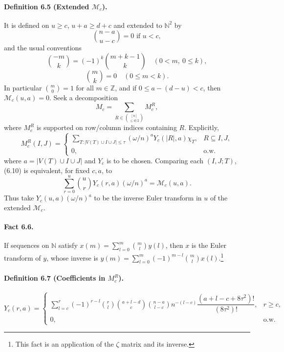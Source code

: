 \documentclass[10pt,a4paper]{article}
\begin{document}
\paragraph{Definition 6.5 (Extended $\mathcal M_c$).} It is defined on $u\ge c$, $u+a\ge d+c$ and extended to $\mathbb N^2$ by
\[\binom{n-a}{u-c}=0\text{ if }u<c,\tag{6.7}\]
and the usual conventions
\[\binom{-m}k=(-1)^k\binom{m+k-1}k\quad(0<m,\ 0\le k),\tag{6.8}\]
\[\binom mk=0\quad(0\le m<k).\tag{6.9}\]
In particular $\binom m0=1$ for all $m\in\mathbb Z$, and if $0\le a-(d-u)<c$, then $\mathcal M_c(u,a)=0$.
Seek a decomposition
\[M_c=\sum_{R\in\binom{[n]}{\le d/2}}M_c^R,\tag{6.10}\]
where $M_c^R$ is supported on row/column indices containing $R$. Explicitly,
\[M_c^R(I,J)=\begin{cases}\sum_{T:|V(T)\cup I\cup J|\le\tau}(\omega/n)^aY_c(|R|,a)\chi_T,&R\subseteq I,J,\\0,&\text{o.w.}\end{cases}\tag{6.11}\]
where $a=|V(T)\cup I\cup J|$ and $Y_c$ is to be chosen. Comparing each $(I,J;T)$, (6.10) is equivalent, for fixed $c,a$, to
\[\sum_{r=0}^u\binom urY_c(r,a)(\omega/n)^a=\mathcal M_c(u,a).\tag{6.12}\]
Thus take $Y_c(u,a)(\omega/n)^a$ to be the inverse Euler transform in $u$ of the extended $\mathcal M_c$.
\paragraph{Fact 6.6.} If sequences on $\mathbb N$ satisfy $x(m)=\sum_{l=0}^m\binom ml y(l)$, then $x$ is the Euler transform of $y$, whose inverse is $y(m)=\sum_{l=0}^m(-1)^{m-l}\binom ml x(l)$.\footnote{This fact is an application of the $\zeta$ matrix and its inverse.}
\paragraph{Definition 6.7 (Coefficients in $M_c^R$).}
\[Y_c(r,a)=\begin{cases}\sum_{l=c}^r(-1)^{r-l}\binom rl\binom{a+l-d}c\binom{n-a}{l-c}n^{-(l-c)}\dfrac{(a+l-c+8\tau^2)!}{(8\tau^2)!},&r\ge c,\\0,&\text{o.w.}\end{cases}\tag{6.13}\]
\end{document}
